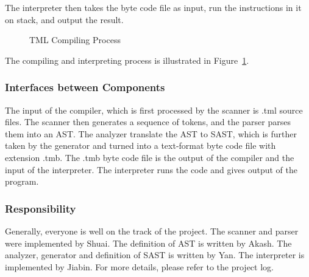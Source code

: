 \documentclass[12pt,psfig,a4]{article}
\begin{document}
The interpreter then takes the byte code file as input, run the instructions in it on stack, and output the result. 

\begin{figure}[hb]
{\centering {} \par}
\caption{TML Compiling Process}
\label{TMLrun}
\end{figure}

The compiling and interpreting process is illustrated in Figure~\ref{TMLrun}.

\subsubsection{Interfaces between Components}
The input of the compiler, which is first processed by the scanner is .tml source files. The scanner then generates a sequence of tokens, and the parser parses them into an AST. The analyzer translate the AST to SAST, which is further taken by the generator and turned into a text-format byte code file with extension .tmb.
The .tmb byte code file is the output of the compiler and the input of the interpreter. The interpreter runs the code and gives output of the program.

\subsubsection{Responsibility}
Generally, everyone is well on the track of the project. 
The scanner and parser were implemented by Shuai.
The definition of AST is written by Akash.
The analyzer, generator and definition of SAST is written by Yan.
The interpreter is implemented by Jiabin.
For more details, please refer to the project log.
\end{document}
